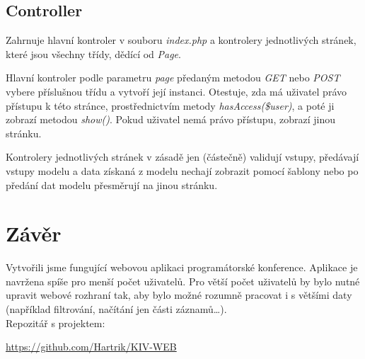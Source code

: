 \documentclass[12pt, a4paper]{article}
\begin{document}
\subsection{Controller}
Zahrnuje hlavní kontroler v souboru \emph{index.php} a kontrolery jednotlivých stránek, které jsou všechny třídy, dědící od \emph{Page}. 

Hlavní kontroler podle parametru \emph{page} předaným metodou \emph{GET} nebo \emph{POST} vybere příslušnou třídu a vytvoří její instanci. Otestuje, zda má uživatel právo přístupu k této stránce, prostřednictvím metody \emph{hasAccess(\$user)}, a poté ji zobrazí metodou \emph{show()}. Pokud uživatel nemá právo přístupu, zobrazí jinou stránku.

Kontrolery jednotlivých stránek v zásadě jen (částečně) validují vstupy, předávají vstupy modelu a data získaná z modelu nechají zobrazit pomocí šablony nebo po předání dat modelu přesměrují na jinou stránku.


\section{Závěr}
Vytvořili jsme fungující webovou aplikaci programátorské konference. Aplikace je navržena spíše pro menší počet uživatelů. Pro větší počet uživatelů by bylo nutné upravit webové rozhraní tak, aby bylo možné rozumně pracovat i s většími daty (například filtrování, načítání jen části záznamů\dots). \\

\noindent
Repozitář s projektem:

\url{https://github.com/Hartrik/KIV-WEB}
\end{document}
